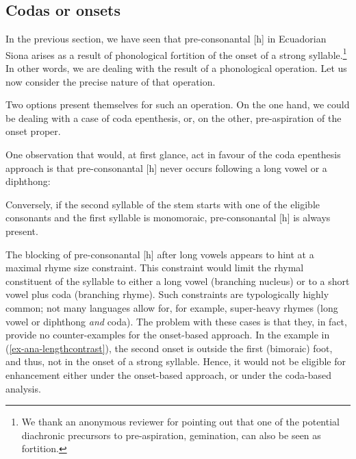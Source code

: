 \documentclass[output=paper]{langscibook}
\begin{document}
\subsection{Codas or onsets}
In the previous section, we have seen that pre-consonantal [h] in Ecuadorian Siona arises as a result of phonological fortition of the onset of a strong syllable.\footnote{We thank an anonymous reviewer for pointing out that one of the potential diachronic precursors to pre-aspiration, gemination, can also be seen as fortition.} In other words, we are dealing with the result of a phonological operation. Let us now consider the precise nature of that operation.

Two options present themselves for such an operation. On the one hand, we could be dealing with a case of coda epenthesis, or, on the other, pre-aspiration of the onset proper. 

One observation that would, at first glance, act in favour of the coda epenthesis approach is that pre-consonantal [h] never occurs following a long vowel or a diphthong:

\begin{exe}
\ex\label{ex-ana-lengthcontrast}
\begin{xlist}
\end{xlist}
\end{exe}

Conversely, if the second syllable of the stem starts with one of the eligible consonants and the first syllable is monomoraic, pre-consonantal [h] is always present.

The blocking of pre-consonantal [h] after long vowels appears to hint at a maximal rhyme size constraint. This constraint would limit the rhymal constituent of the syllable to either a long vowel (branching nucleus) or to a short vowel plus coda (branching rhyme). Such constraints are typologically highly common; not many languages allow for, for example, super-heavy rhymes (long vowel or diphthong \emph{and} coda). The problem with these cases is that they, in fact, provide no counter-examples for the onset-based approach. In the example in (\ref{ex-ana-lengthcontrast}), the second onset is outside the first (bimoraic) foot, and thus, not in the onset of a strong syllable. Hence, it would not be eligible for enhancement either under the onset-based approach, or under the coda-based analysis.
\end{document}

